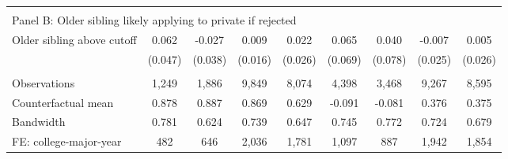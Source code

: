 {{\begin{tabular}{lcccccccc}
&  &  &  & & & & & &    \\
\multicolumn{9}{l}{Panel B: Older sibling likely applying to private if rejected} \\
Older sibling above cutoff&       0.062   &      -0.027   &       0.009   &       0.022   &       0.065   &       0.040   &      -0.007   &       0.005   \\
                    &     (0.047)   &     (0.038)   &     (0.016)   &     (0.026)   &     (0.069)   &     (0.078)   &     (0.025)   &     (0.026)   \\
                    &               &               &               &               &               &               &               &               \\
Observations        &       1,249   &       1,886   &       9,849   &       8,074   &       4,398   &       3,468   &       9,267   &       8,595   \\
Counterfactual mean &       0.878   &       0.887   &       0.869   &       0.629   &      -0.091   &      -0.081   &       0.376   &       0.375   \\
Bandwidth           &       0.781   &       0.624   &       0.739   &       0.647   &       0.745   &       0.772   &       0.724   &       0.679   \\
FE: college-major-year&         482   &         646   &       2,036   &       1,781   &       1,097   &         887   &       1,942   &       1,854   \\
 

\bottomrule
\end{tabular}
}
}
